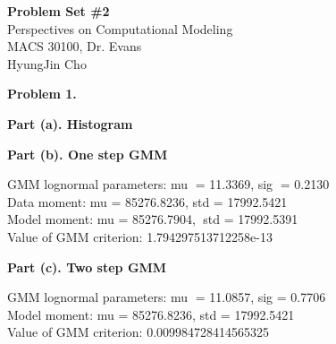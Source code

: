 \documentclass[letterpaper,12pt]{article}
\theoremstyle{definition}
\begin{document}
\begin{flushleft}
  \textbf{\large{Problem Set \#2}} \\
  Perspectives on Computational Modeling \\
  MACS 30100, Dr. Evans \\
  HyungJin Cho
\end{flushleft}

\vspace{5mm}

\begin{enumerate}
  \textbf{Problem 1.}
\end {enumerate}
\begin{enumerate}
  \textbf{Part (a). Histogram}
\par
\begin{figure}[H]\centering\captionsetup{width=4.0in}
\end{figure}
\par\bigskip
\end {enumerate}

\begin{enumerate}
  \textbf{Part (b). One step GMM}
\par
\begin{figure}[H]\centering\captionsetup{width=4.0in}
\end{figure}
\par
GMM lognormal parameters: mu = 11.3369, sig = 0.2130 \\
Data moment: mu = 85276.8236, std = 17992.5421 \\
Model moment: mu = 85276.7904, std = 17992.5391 \\
Value of GMM criterion: 1.794297513712258e-13 \\
\par\bigskip
\end {enumerate}

\begin{enumerate}
  \textbf{Part (c). Two step GMM}
\par
\begin{figure}[H]\centering\captionsetup{width=4.0in}
\end{figure}
\par
GMM lognormal parameters: mu = 11.0857, sig = 0.7706 \\
Model moment: mu = 85276.8236, std = 17992.5421 \\
Value of GMM criterion: 0.009984728414565325 \\
\par\bigskip
\end {enumerate}
\end{document}

